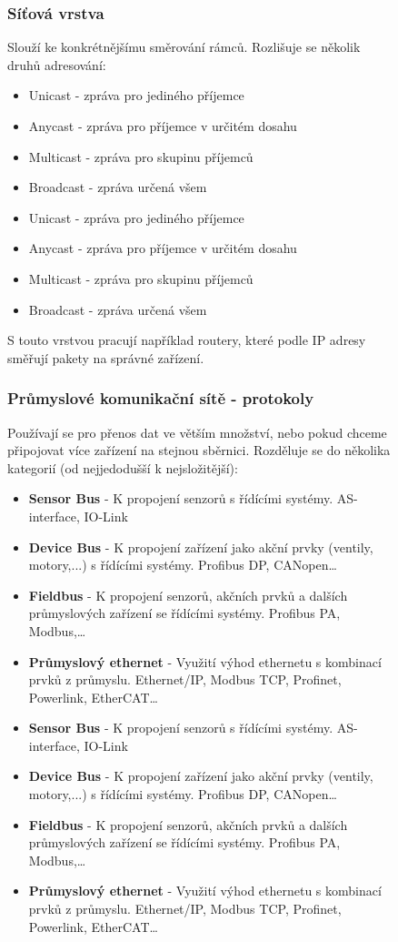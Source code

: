 \begin{figure}[h]
\subsubsection*{Síťová vrstva}
Slouží ke konkrétnějšímu směrování rámců. Rozlišuje se několik druhů adresování:
\begin{itemize}
  \item Unicast - zpráva pro jediného příjemce
  \item Anycast - zpráva pro příjemce v určitém dosahu
  \item Multicast - zpráva pro skupinu příjemců
  \item Broadcast - zpráva určená všem
    \item Unicast - zpráva pro jediného příjemce
    \item Anycast - zpráva pro příjemce v určitém dosahu
    \item Multicast - zpráva pro skupinu příjemců
    \item Broadcast - zpráva určená všem
\end{itemize}
S touto vrstvou pracují například routery, které podle IP adresy směřují pakety na správné zařízení.

\subsubsection*{Průmyslové komunikační sítě - protokoly}
Používají se pro přenos dat ve větším množství, nebo pokud chceme připojovat více zařízení na stejnou sběrnici.
Rozděluje se do několika kategorií (od nejjedodušší k nejsložitější):
\begin{itemize}
  \item \textbf{Sensor Bus} - K propojení senzorů s řídícími systémy. AS-interface, IO-Link
  \item \textbf{Device Bus} - K propojení zařízení jako akční prvky (ventily, motory,...) s řídícími systémy. Profibus DP, CANopen\dots
  \item \textbf{Fieldbus} - K propojení senzorů, akčních prvků a dalších průmyslových zařízení se řídícími systémy. Profibus PA, Modbus,\dots
  \item \textbf{Průmyslový ethernet} - Využití výhod ethernetu s kombinací prvků z průmyslu. Ethernet/IP, Modbus TCP, Profinet, Powerlink, EtherCAT\dots
    \item \textbf{Sensor Bus} - K propojení senzorů s řídícími systémy. AS-interface, IO-Link
    \item \textbf{Device Bus} - K propojení zařízení jako akční prvky (ventily, motory,...) s řídícími systémy. Profibus DP, CANopen\dots
    \item \textbf{Fieldbus} - K propojení senzorů, akčních prvků a dalších průmyslových zařízení se řídícími systémy. Profibus PA, Modbus,\dots
    \item \textbf{Průmyslový ethernet} - Využití výhod ethernetu s kombinací prvků z průmyslu. Ethernet/IP, Modbus TCP, Profinet, Powerlink, EtherCAT\dots
\end{itemize}


\end{figure}
